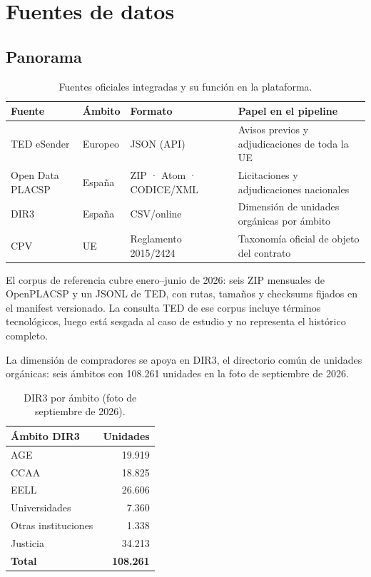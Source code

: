 \documentclass[11pt,a4paper]{article}
\newcommand{\cabecera}[1]{{\bfseries #1}}
\begin{document}
\section{Fuentes de datos}

\subsection{Panorama}

\begin{table}[ht]
\centering
\small
\begin{tabularx}{\textwidth}{@{}l l l X@{}}
\toprule
\cabecera{Fuente} & \cabecera{Ámbito} & \cabecera{Formato} & \cabecera{Papel en el pipeline}\\
\midrule
TED eSender & Europeo & JSON (API) & Avisos previos y adjudicaciones de toda la UE\\
Open Data PLACSP & España & ZIP · Atom · CODICE/XML & Licitaciones y adjudicaciones nacionales\\
DIR3 & España & CSV/online & Dimensión de unidades orgánicas por ámbito\\
CPV & UE & Reglamento 2015/2424 & Taxonomía oficial de objeto del contrato\\
\bottomrule
\end{tabularx}
\caption{Fuentes oficiales integradas y su función en la plataforma.}
\end{table}

El corpus de referencia cubre enero--junio de 2026: seis ZIP mensuales de
OpenPLACSP y un JSONL de TED, con rutas, tamaños y checksums fijados en el
manifest versionado. La consulta TED de ese corpus incluye términos
tecnológicos, luego está sesgada al caso de estudio y no representa el
histórico completo.

La dimensión de compradores se apoya en DIR3, el directorio común de unidades
orgánicas: seis ámbitos con 108.261 unidades en la foto de septiembre de 2026.

\begin{table}[ht]
\centering
\small
\begin{tabularx}{0.62\textwidth}{@{}X r@{}}
\toprule
\cabecera{Ámbito DIR3} & \cabecera{Unidades}\\
\midrule
AGE & 19.919\\
CCAA & 18.825\\
EELL & 26.606\\
Universidades & 7.360\\
Otras instituciones & 1.338\\
Justicia & 34.213\\
\midrule
\cabecera{Total} & \cabecera{108.261}\\
\bottomrule
\end{tabularx}
\caption{DIR3 por ámbito (foto de septiembre de 2026).}
\end{table}
\end{document}
